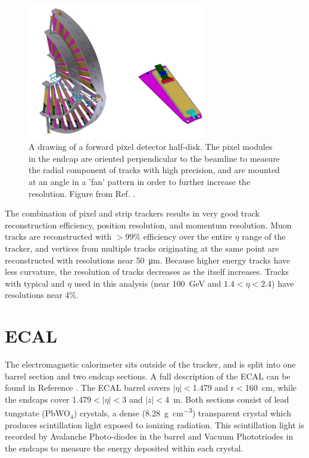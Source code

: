 \begin{figure}[htbp]
    \includegraphics[width=0.7\textwidth]{figures/fpix_drawing.png}
    \centering
	\caption[Schematic of a forward tracker half-disk]{A drawing of a forward pixel detector half-disk. The pixel modules in the endcap are oriented perpendicular to the beamline to measure the radial component of tracks with high precision, and are mounted at an angle in a 'fan' pattern in order to further increase the resolution. Figure from Ref. \cite{pixelUpgrade}.}
    \label{fig:fpixExample}
\end{figure}

The combination of pixel and strip trackers results in very good track reconstruction efficiency, position resolution, and momentum resolution.
Muon tracks are reconstructed with $>99\%$ efficiency over the entire $\eta$ range of the tracker, and vertices from multiple tracks originating at the same point are reconstructed with resolutions near \SI{50}{\micro\meter}.
Because higher energy tracks have less curvature, the \pt resolution of tracks decreases as the \pt itself increases. Tracks with typical \pt and $\eta$ used in this analysis (\pt near \SI{100}{\giga\eV} and $1.4<\eta<2.4$) have resolutions near 4$\%$. 

\section{ECAL}
The electromagnetic calorimeter sits outside of the tracker, and is split into one barrel section and two endcap sections. 
A full description of the ECAL can be found in Reference \cite{ECALtdr}.
The ECAL barrel covers $\lvert\eta\rvert<$1.479 and r$<$\SI{160}{\centi\meter}, while the endcaps cover 1.479$<\lvert\eta\rvert<$3 and $\lvert z \rvert<$\SI{4}{\meter}. 
Both sections consist of lead tungstate (PbWO$_4$) crystals, a dense (\SI{8.28}{\gram\per\cubic\centi\meter}) transparent crystal which produces scintillation light exposed to ionizing radiation. 
This scintillation light is recorded by Avalanche Photo-diodes in the barrel and Vacuum Phototriodes in the endcaps to measure the energy deposited within each crystal. 

